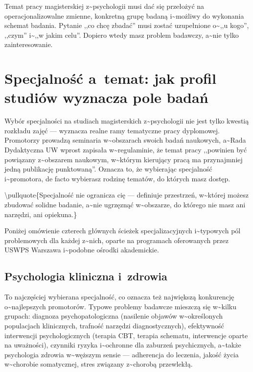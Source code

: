 \documentclass[12pt,a4paper,twoside,openany]{book}
\let\bforigsection\section
\renewcommand{\section}{\needspace{4\baselineskip}\bforigsection}
\begin{document}
\begin{keyinsight} Temat pracy magisterskiej z\textasciitilde{}psychologii musi dać się przełożyć na operacjonalizowalne zmienne, konkretną grupę badaną i\textasciitilde{}możliwy do wykonania schemat badania. Pytanie ,,co chcę zbadać'' musi zostać uzupełnione o\textasciitilde{},,u kogo'', ,,czym'' i\textasciitilde{},,w jakim celu''. Dopiero wtedy masz problem badawczy, a\textasciitilde{}nie tylko zainteresowanie.
\end{keyinsight}


\section{Specjalność a~temat: jak profil studiów wyznacza pole badań}


Wybór specjalności na studiach magisterskich z\textasciitilde{}psychologii nie jest tylko kwestią rozkładu zajęć --- wyznacza realne ramy tematyczne pracy dyplomowej. Promotorzy prowadzą seminaria w\textasciitilde{}obszarach swoich badań naukowych, a\textasciitilde{}Rada Dydaktyczna UW wprost zapisała w\textasciitilde{}regulaminie, że temat pracy ,,powinien być powiązany z\textasciitilde{}obszarem naukowym, w\textasciitilde{}którym kierujący pracą ma przynajmniej jedną publikację punktowaną''. Oznacza to, że wybierając specjalność i\textasciitilde{}promotora, de facto wybierasz rodzinę tematów, do których masz dostęp.


\textbackslash{}pullquote\{Specjalność nie ogranicza cię --- definiuje przestrzeń, w\textasciitilde{}której możesz zbudować solidne badanie, a\textasciitilde{}nie ugrzęznąć w\textasciitilde{}obszarze, do którego nie masz ani narzędzi, ani opiekuna.\}


Poniżej omówienie czterech głównych ścieżek specjalizacyjnych i\textasciitilde{}typowych pól problemowych dla każdej z\textasciitilde{}nich, oparte na programach oferowanych przez USWPS Warszawa i\textasciitilde{}podobne ośrodki akademickie.


\subsection{Psychologia kliniczna i~zdrowia}


To najczęściej wybierana specjalność, co oznacza też największą konkurencję o\textasciitilde{}najlepszych promotorów. Typowe problemy badawcze mieszczą się w\textasciitilde{}kilku grupach: diagnoza psychopatologiczna (nasilenie objawów w\textasciitilde{}określonych populacjach klinicznych, trafność narzędzi diagnostycznych), efektywność interwencji psychologicznych (terapia CBT, terapia schematu, interwencje oparte na uważności), czynniki ryzyka i\textasciitilde{}ochronne dla zaburzeń psychicznych, a\textasciitilde{}także psychologia zdrowia w\textasciitilde{}węższym sensie --- adherencja do leczenia, jakość życia w\textasciitilde{}chorobie somatycznej, stres związany z\textasciitilde{}chorobą przewlekłą.
\end{document}
